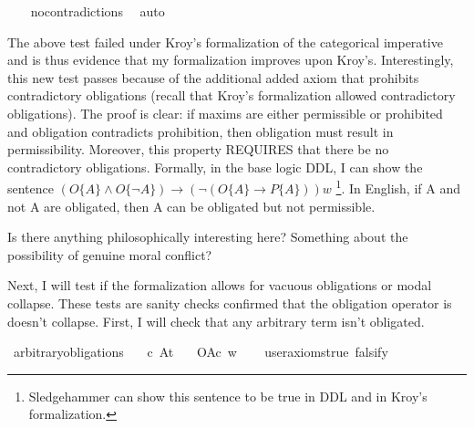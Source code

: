 \begin{isabellebody}
%
\isadelimproof
\ \ %
\endisadelimproof
%
\isatagproof
{}\isamarkupfalse%
\ no{\isacharunderscore}contradictions\ \isamarkupfalse%
\ auto\isanewline
%
%
\endisatagproof
{\isafoldproof}%
%
\isadelimproof
%
\endisadelimproof
%
\begin{isamarkuptext}%
The above test failed under Kroy's formalization of the categorical imperative and is thus evidence 
that my formalization improves upon Kroy's. Interestingly, this new test passes because of the additional
added axiom that prohibits contradictory obligations (recall that Kroy's formalization allowed contradictory
obligations). The proof is clear: if maxims are either permissible or prohibited and obligation contradicts
prohibition, then obligation must result in permissibility. Moreover, this property REQUIRES that 
there be no contradictory obligations. Formally, in the base logic DDL, I can show the sentence 
$(O \{A\} \wedge O \{\neg A\}) \mathbf{\longrightarrow} (\neg (O \{A\} \mathbf{\longrightarrow}  P \{A\})) w$
\footnote{Sledgehammer can show this sentence to be true in DDL and in Kroy's formalization.}.
In English, if A and not A are obligated, then A can be obligated but not permissible.

Is there anything philosophically interesting here? Something about the possibility of genuine moral 
conflict?%
\end{isamarkuptext}\isamarkuptrue%
%
\begin{isamarkuptext}%
Next, I will test if the formalization allows for vacuous obligations or modal collapse. These 
tests are sanity checks confirmed that the obligation operator is doesn't collapse. First, I will check 
that any arbitrary term isn't obligated.%
\end{isamarkuptext}\isamarkuptrue%
\isamarkupfalse%
\ arbitrary{\isacharunderscore}obligations{\isacharcolon}\isanewline
\ \ \ c\ A{\isacharcolon}{\isacharcolon}{\isachardoublequoteopen}t{\isachardoublequoteclose}\isanewline
\ \ \ {\isachardoublequoteopen}O{\isacharbraceleft}A{\isacharbar}c{\isacharbraceright}\ w{\isachardoublequoteclose}\isanewline
\ \ \isamarkupfalse%
\ {\isacharbrackleft}user{\isacharunderscore}axioms{\isacharequal}true{\isacharcomma}\ falsify{\isacharbrackright}%
\isadelimproof
\ %
\endisadelimproof
%
\isatagproof
{}\isamarkupfalse%
\isanewline
%
\end{isabellebody}
